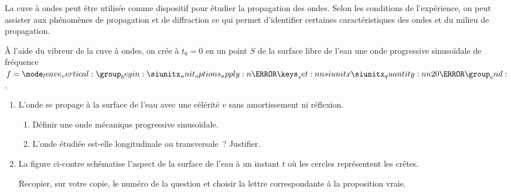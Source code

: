 La cuve à ondes peut être utilisée comme dispositif pour étudier la propagation
des ondes. Selon les conditions de l'expérience, on peut assister aux phénomènes
de propagation et de diffraction ce qui permet d'identifier certaines
caractéristiques des ondes et du milieu de propagation.

À l'aide du vibreur de la cuve à ondes, on crée à $t_{0}=0$ en un point $S$ de
la surface libre de l'eau une onde progressive sinusoïdale de fréquence
$\freq=\qty{20}{\Hz}$.

\begin{enumerate}
    \item L'onde se propage à la surface de l'eau avec une célérité $v$ sans
          amortissement ni réflexion.
          \begin{enumerate}
              \item Définir une onde mécanique progressive sinusoïdale.
              \item L'onde étudiée est-elle longitudinale ou transversale~?
                    Justifier.
          \end{enumerate}
    \item \mbox{}
          \begin{minipage}[t][][t]{0.76\linewidth}
              La figure ci-contre schématise l'aspect de la surface de l'eau à
              un instant $t$ où les cercles représentent les crêtes.

              Recopier, sur votre copie, le numéro de la question et choisir la
              lettre correspondante à la proposition vraie.
          \end{minipage}
          \hfill
          \begin{minipage}[t][][t]{0.20\linewidth}
              \begin{figure}[H]
                  \centering
              \end{figure}
          \end{minipage}


\end{enumerate}
